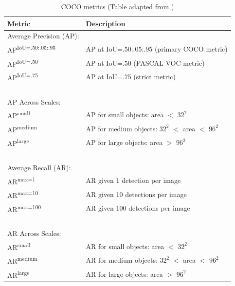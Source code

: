 \documentclass[report.tex]{subfiles}
\begin{document}
    \begin{table}[!ht]
        \centering
        \caption{COCO metrics (Table adapted from \cite{lin2014microsoft})}
        \begin{tabular}{ll}
        \hline
            \textbf{Metric} & \textbf{Description} \\ \hline
            Average Precision (AP): & ~ \\ \hline
            AP\textsuperscript{IoU=.50:.05:.95} & AP at IoU=.50:.05:.95 (primary COCO metric) \\
            AP\textsuperscript{IoU=.50} & AP at IoU=.50 (PASCAL VOC metric) \\
            AP\textsuperscript{IoU=.75} & AP at IoU=.75 (strict metric) \\
            ~ & ~ \\ \hline
            AP Across Scales: & ~ \\ \hline
            AP\textsuperscript{small} & AP for small objects: area $<$ $32^2$ \\
            AP\textsuperscript{medium} & AP for medium objects: $32^2$ $<$ area $<$ $96^2$ \\
            AP\textsuperscript{large} & AP for large objects: area $>$ $96^2$ \\
            ~ & ~ \\ \hline
            Average Recall (AR): & ~ \\ \hline
            AR\textsuperscript{max=1} & AR given 1 detection per image \\ 
            AR\textsuperscript{max=10} & AR given 10 detections per image \\ 
            AR\textsuperscript{max=100} & AR given 100 detections per image \\ 
            ~ & ~ \\ \hline
            AR Across Scales: & ~ \\ \hline
            AR\textsuperscript{small} & AR for small objects: area $<$ $32^2$ \\
            AR\textsuperscript{medium} & AR for medium objects: $32^2$ $<$ area $<$ $96^2$ \\
            AR\textsuperscript{large} & AR for large objects: area $>$ $96^2$ \\
        \end{tabular}
        \label{tab:coco_metrics}
    \end{table}
\end{document}
